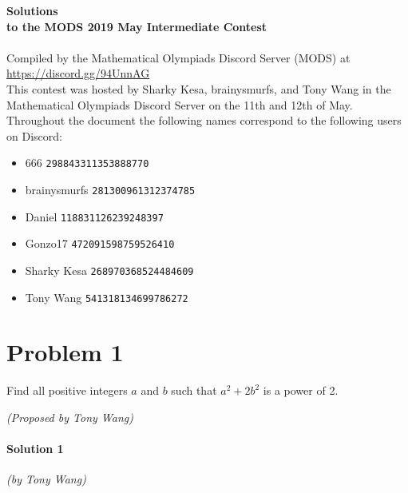 \documentclass[10pt]{article}
\begin{document}
		\setcounter{section}{0}
		\noindent \huge\textbf{Solutions}\vspace{2pt}\\
		\noindent \large\textbf{to the MODS 2019 May Intermediate Contest} \vspace{3pt}\\
		\noindent \makebox[\linewidth]{\rule{\textwidth}{0.4pt}}\\
	
		\noindent \normalsize Compiled by the Mathematical Olympiads Discord Server (MODS) at \url{https://discord.gg/94UnnAG}\\
		
		\noindent This contest was hosted by Sharky Kesa, brainysmurfs, and Tony Wang in the Mathematical Olympiads Discord Server on the 11th and 12th of May. Throughout the document the following names correspond to the following users on Discord:
		\begin{itemize}[noitemsep]
		\item 666 \tabto*{80pt}\texttt{298843311353888770}
		\item brainysmurfs \tabto*{80pt}\texttt{281300961312374785}
		\item Daniel \tabto*{80pt}\texttt{118831126239248397}
		\item Gonzo17 \tabto*{80pt}\texttt{472091598759526410}
		\item Sharky Kesa \tabto*{80pt}\texttt{268970368524484609}
		\item Tony Wang \tabto*{80pt}\texttt{541318134699786272}
		\end{itemize}
		
		
	\newpage		
			
	\section*{Problem 1}
	
	Find all positive integers \(a\) and \(b\) such that \(a^2  + 2b^2\) is a power of 2.
	\begin{flushright}
	\textit{(Proposed by Tony Wang)}
	\end{flushright}
	
		\noindent \makebox[\linewidth]{\rule{\textwidth}{0.4pt}}
	
	\paragraph{Solution 1} \textit{(by Tony Wang)}\\
	
\end{document}
